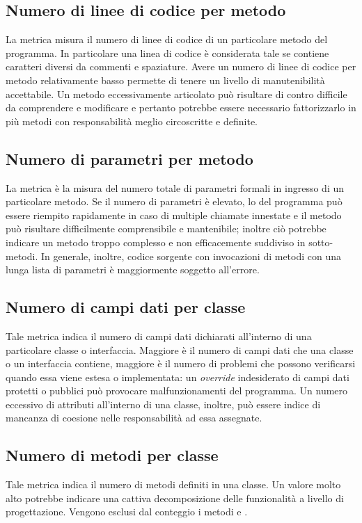 \subsection{Numero di linee di codice per metodo}
La metrica misura il numero di linee di codice di un particolare metodo del programma. In particolare una linea di codice è considerata tale se contiene caratteri diversi da commenti e spaziature. Avere un numero di linee di codice per metodo relativamente basso permette di tenere un livello di manutenibilità accettabile. Un metodo eccessivamente articolato può risultare di contro difficile da comprendere e modificare e pertanto potrebbe essere necessario fattorizzarlo in più metodi con responsabilità meglio circoscritte e definite.



\subsection{Numero di parametri per metodo}
La metrica è la misura del numero totale di parametri formali in ingresso di un particolare metodo. Se il numero di parametri è elevato, lo  del programma può essere riempito rapidamente in caso di multiple chiamate innestate e il metodo può risultare difficilmente comprensibile e mantenibile; inoltre ciò potrebbe indicare un metodo troppo complesso e non efficacemente suddiviso in sotto-metodi. In generale, inoltre, codice sorgente con invocazioni di metodi con una lunga lista di parametri è maggiormente soggetto all'errore.



\subsection{Numero di campi dati per classe}
Tale metrica indica il numero di campi dati dichiarati all'interno di una particolare classe o interfaccia. Maggiore è il numero di campi dati che una classe o un interfaccia contiene, maggiore è il numero di problemi che possono verificarsi quando essa viene estesa o implementata: un \emph{override} indesiderato di campi dati protetti o pubblici può provocare malfunzionamenti del programma. Un numero eccessivo di attributi all'interno di una classe, inoltre, può essere indice di mancanza di coesione nelle responsabilità ad essa assegnate.



\subsection{Numero di metodi per classe}
Tale metrica indica il numero di metodi definiti in una classe. Un valore molto alto potrebbe indicare una cattiva decomposizione delle funzionalità a livello di progettazione. Vengono esclusi dal conteggio i metodi \emph{} e \emph{}.



